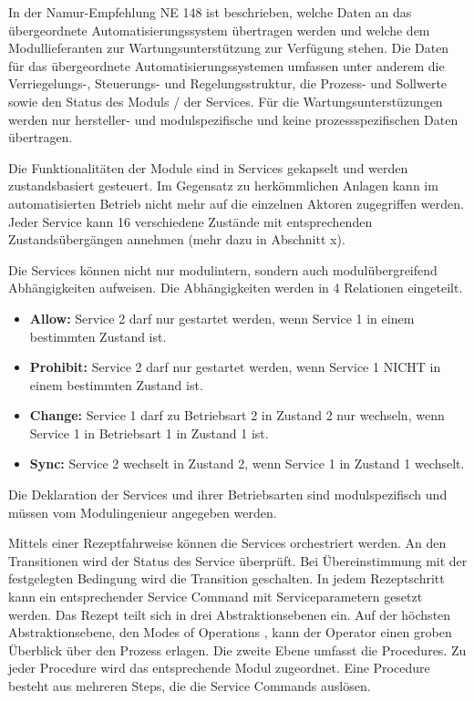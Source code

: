 In der Namur-Empfehlung NE 148 \cite{NAMURArbeitskreis1.122013} ist beschrieben, welche Daten an das übergeordnete Automatisierungssystem übertragen werden und welche dem Modullieferanten zur Wartungsunterstützung zur Verfügung stehen. Die Daten für das übergeordnete Automatisierungssystemen umfassen unter anderem die Verriegelungs-, Steuerungs- und Regelungsstruktur, die Prozess- und Sollwerte sowie den Status des Moduls / der Services. Für die Wartungsunterstüzungen werden nur hersteller- und modulspezifische und keine prozessspezifischen Daten übertragen.

Die Funktionalitäten der Module sind in Services gekapselt und werden zustandsbasiert gesteuert. Im Gegensatz zu herkömmlichen Anlagen kann im automatisierten Betrieb nicht mehr auf die einzelnen Aktoren zugegriffen werden. Jeder Service kann 16 verschiedene Zustände mit entsprechenden Zustandsübergängen annehmen (mehr dazu in Abschnitt x).

Die Services können nicht nur modulintern, sondern auch modulübergreifend Abhängigkeiten aufweisen. Die Abhängigkeiten werden in 4 Relationen eingeteilt.
\begin{itemize}
\item \textbf{Allow:} Service 2 darf nur gestartet werden, wenn Service 1 in einem bestimmten Zustand ist.
\item \textbf{Prohibit:} Service 2 darf nur gestartet werden, wenn Service 1 NICHT in einem bestimmten Zustand ist.
\item \textbf{Change:} Service 1 darf zu Betriebsart 2 in Zustand 2 nur wechseln, wenn Service 1 in Betriebsart 1 in Zustand 1 ist.
\item \textbf{Sync:} Service 2 wechselt in Zustand 2, wenn Service 1 in Zustand 1 wechselt.
\end{itemize} 
Die Deklaration der Services und ihrer Betriebsarten sind modulspezifisch und müssen vom Modulingenieur angegeben werden. \cite{Ladiges2018}

Mittels einer Rezeptfahrweise können die Services orchestriert werden. An den Transitionen wird der Status des Service überprüft. Bei Übereinstimmung mit der festgelegten Bedingung wird die Transition geschalten. In jedem Rezeptschritt kann ein entsprechender Service Command mit Serviceparametern gesetzt werden. Das Rezept teilt sich in drei Abstraktionsebenen ein. Auf der höchsten Abstraktionsebene, den Modes of Operations \todo{}, kann der Operator einen groben Überblick über den Prozess erlagen. Die zweite Ebene umfasst die Procedures. Zu jeder Procedure wird das entsprechende Modul zugeordnet. Eine Procedure besteht aus mehreren Steps, die die Service Commands auslösen. 

